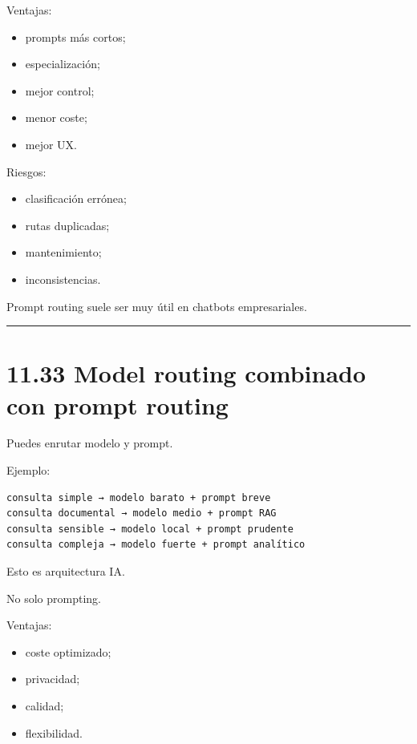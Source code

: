Ventajas:

\begin{itemize}
\tightlist
\item
  prompts más cortos;
\item
  especialización;
\item
  mejor control;
\item
  menor coste;
\item
  mejor UX.
\end{itemize}

Riesgos:

\begin{itemize}
\tightlist
\item
  clasificación errónea;
\item
  rutas duplicadas;
\item
  mantenimiento;
\item
  inconsistencias.
\end{itemize}

Prompt routing suele ser muy útil en chatbots empresariales.

\begin{center}\rule{0.5\linewidth}{0.5pt}\end{center}

\section{11.33 Model routing combinado con prompt
routing}\label{model-routing-combinado-con-prompt-routing}

Puedes enrutar modelo y prompt.

Ejemplo:

\begin{lstlisting}
consulta simple → modelo barato + prompt breve
consulta documental → modelo medio + prompt RAG
consulta sensible → modelo local + prompt prudente
consulta compleja → modelo fuerte + prompt analítico
\end{lstlisting}

Esto es arquitectura IA.

No solo prompting.

Ventajas:

\begin{itemize}
\tightlist
\item
  coste optimizado;
\item
  privacidad;
\item
  calidad;
\item
  flexibilidad.
\end{itemize}

